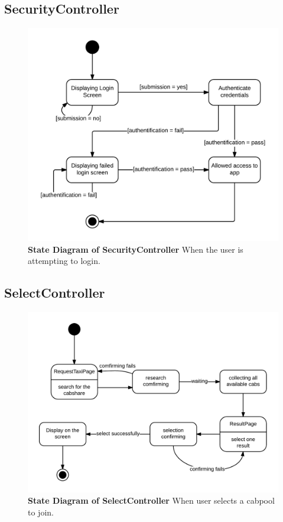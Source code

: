\documentclass[]{article}
\begin{document}
\subsection{SecurityController}

\begin{figure}[H]
\label{SecCState}
	\centering
	\includegraphics[width=1\textwidth]{SecurityController.png}
	\caption{\textbf{State Diagram of SecurityController} When the user is attempting to login.}
\end{figure}

\subsection{SelectController}

\begin{figure}[H]
\label{SelCState}
	\centering
	\includegraphics[width=1\textwidth]{SelectController.png}
	\caption{\textbf{State Diagram of SelectController} When user selects a cabpool to join.}
\end{figure}
\end{document}
